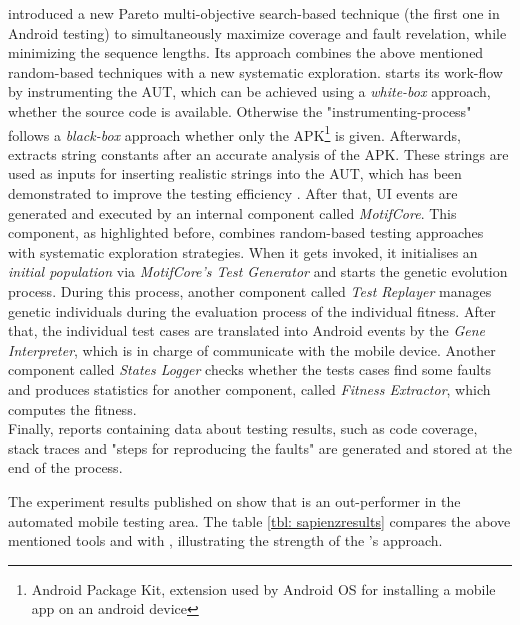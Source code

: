 \sapienz \cite{sapienz} introduced a new Pareto multi-objective search-based technique (the first one in Android testing) to simultaneously maximize coverage and fault revelation, while minimizing the sequence lengths. Its approach combines the above mentioned random-based techniques with a new systematic exploration. \sapienz starts its work-flow by instrumenting the AUT, which can be achieved using a \textit{white-box} approach, whether the source code is available. Otherwise the "instrumenting-process" follows a \textit{black-box} approach whether only the APK\footnote{Android Package Kit, extension used by Android OS for installing a mobile app on an android device} is given.  
Afterwards, \sapienz extracts string constants after an accurate analysis of the APK. These strings are used as inputs for inserting realistic strings into the AUT, which has been demonstrated to improve the testing efficiency \cite{sapienz}. After that, UI events are generated and executed by an internal component called \textit{MotifCore}. 
This component, as highlighted before, combines random-based testing approaches with systematic exploration strategies. When it gets invoked, it initialises an \textit{initial population} via \textit{MotifCore's Test Generator} and starts the genetic evolution process. 
During this process, another component called \textit{Test Replayer} manages genetic individuals during the evaluation process of the individual fitness. After that, the individual test cases are translated into Android events by the \textit{Gene Interpreter}, which is in charge of communicate with the mobile device. 
Another component called \textit{States Logger} checks whether the tests cases find some faults and produces statistics for another component, called \textit{Fitness Extractor}, which computes the fitness. \\
Finally, reports containing data about testing results, such as code coverage, stack traces and "steps for reproducing the faults" are generated and stored at the end of the process.  


The experiment results published on \cite{sapienz} show that \sapienz is an out-performer in the automated mobile testing area. The table \ref{tbl: sapienzresults} compares the above mentioned tools \monkey and \dynodroid with \sapienz, illustrating the strength of the \sapienz's approach. 

